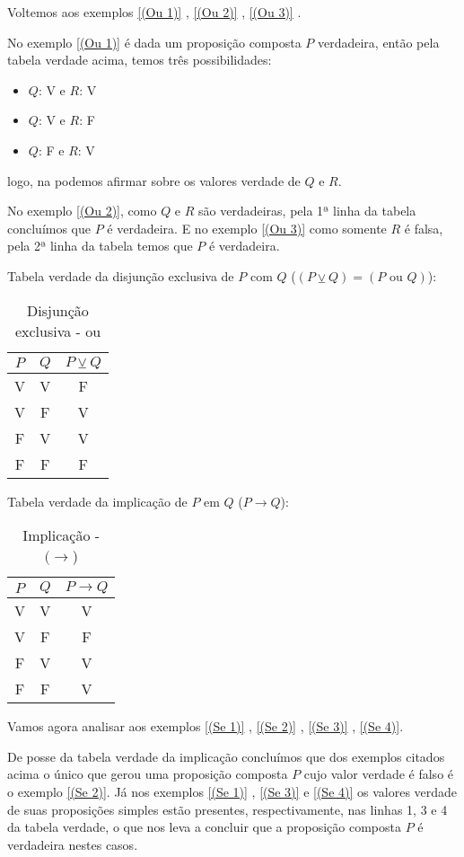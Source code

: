  \begin{exem}
  Voltemos aos exemplos \ref{(Ou 1)} , \ref{(Ou 2)} , \ref{(Ou 3)} .

  No exemplo \ref{(Ou 1)} é dada um proposição composta $P$ verdadeira, então pela tabela verdade acima, temos três possibilidades:
  \begin{itemize}
   \item $Q$: V e $R$: V
   \item $Q$: V e $R$: F
   \item $Q$: F e $R$: V
  \end{itemize}
  logo, na podemos afirmar sobre os valores verdade de $Q$ e $R$.

  No exemplo \ref{(Ou 2)}, como $Q$ e $R$ são verdadeiras, pela 1ª linha da tabela concluímos que $P$ é verdadeira. E no exemplo \ref{(Ou 3)} como somente $R$ é falsa, pela 2ª linha da tabela temos que $P$ é verdadeira.

 \end{exem}

 Tabela verdade da disjunção exclusiva de $P$ com $Q$ ($(P \veebar Q)= (P \text{ ou } Q)$):
 \begin{table}[H]
 \centering
 \begin{tabular}{|c|c|c|} \hline
 \rowcolor{cinza}
 $P$ & $Q$ & $P \veebar Q$ \\ \hline
 V & V & F \\ \hline
 V & F & V \\ \hline
 F & V & V \\ \hline
 F & F & F \\ \hline
 \end{tabular}
 \caption{Disjunção exclusiva - ou}
\end{table}


 Tabela verdade da implicação de $P$ em $Q$ ($P \rightarrow Q $):
 \begin{table}[H]
 \centering
 \begin{tabular}{|c|c|c|} \hline
 \rowcolor{cinza}
 $P$ & $Q$ & $P \rightarrow Q$ \\ \hline
 V & V & V \\ \hline
 V & F & F \\ \hline
 F & V & V \\ \hline
 F & F & V \\ \hline
 \end{tabular}
 \caption{Implicação - $(\rightarrow$)}
\end{table}

 \begin{exem}
  Vamos agora analisar aos exemplos \ref{(Se 1)} , \ref{(Se 2)} , \ref{(Se 3)} , \ref{(Se 4)}.

  De posse da tabela verdade da implicação concluímos que dos exemplos citados acima o único que gerou uma proposição composta $P$ cujo valor verdade é falso é o exemplo \ref{(Se 2)}. Já nos exemplos \ref{(Se 1)} , \ref{(Se 3)} e \ref{(Se 4)} os valores verdade de suas proposições simples estão presentes, respectivamente, nas linhas 1, 3 e 4 da tabela verdade, o que nos leva a concluir que a proposição composta $P$ é verdadeira nestes casos.

  \end{exem}

